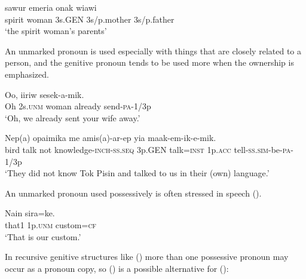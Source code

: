 \ea%
\label{ex:x410}
\gll sawur  emeria    onak  wiawi \\
    spirit  woman  3s.GEN  3s/p.mother  3s/p.father  \\
\glt`the spirit woman's parents'
\z





An unmarked pronoun is used especially with things that are closely related to a person, and the genitive pronoun tends to be used more when the ownership is emphasized. 

\ea%
\label{ex:x1315}
\gll Oo,     iiriw  sesek-a-mik. \\
   Oh  2s.\textsc{unm}  woman  already  send-\textsc{pa}-1/3p   \\
\glt`Oh, we already sent your wife away.'
\z





\ea%
\label{ex:x1314}
\gll Nep(a)  opaimika  me  amis(a)-ar-ep     yia  maak-em-ik-e-mik.\\
    bird  talk  not  knowledge-\textsc{inch}-\textsc{ss}.\textsc{seq}  3p.GEN  talk=\textsc{inst}  1p.\textsc{acc}  tell-\textsc{ss}.\textsc{sim}-be-\textsc{pa}-1/3p\\
\glt`They did not know Tok Pisin and talked to us in their (own) language.'
\z









An unmarked pronoun used possessively is often stressed in speech ().

\ea%
\label{ex:x408}
\gll Nain   sira=ke. \\
     that1  1p.\textsc{unm}  custom=\textsc{cf} \\
\glt`That is our custom.'
\z





In recursive genitive structures like () more than one possessive pronoun may occur as a pronoun copy, so () is a possible alternative for ():

